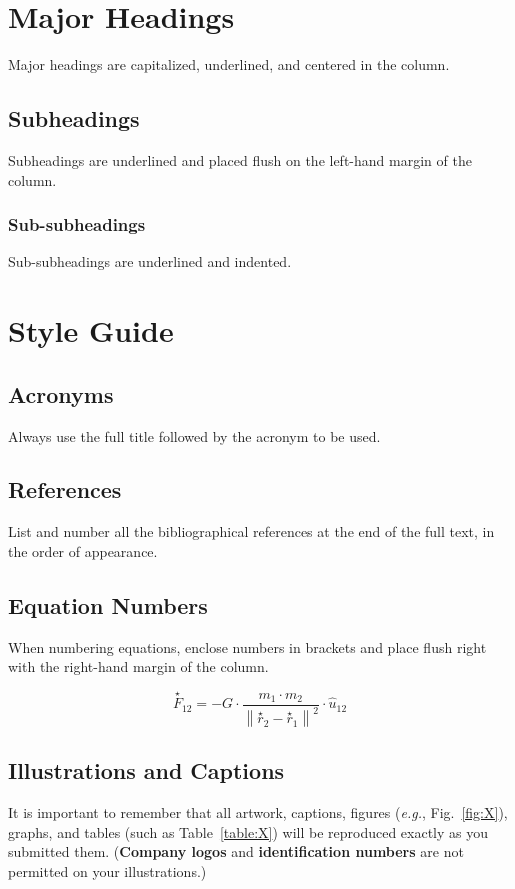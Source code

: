 \documentclass[]{iac}
\begin{document}
\section{Major Headings}
Major headings are capitalized, underlined, and centered in the column.

\subsection{Subheadings}
Subheadings are underlined and placed flush on the left-hand margin of the column.

\subsubsection{Sub-subheadings}
Sub-subheadings are underlined and indented.

\section{Style Guide}

\subsection{Acronyms}
Always use the full title followed by the acronym to be used.

\subsection{References}
List and number all the bibliographical references at the end of the full text, in the order of appearance.~\cite{test_citation}

\subsection{Equation Numbers}
When numbering equations, enclose numbers in brackets and place flush right with the right-hand margin of the column.

\begin{equation}
\stackrel{\star}{F}_{12} = -G \cdot \frac{ m_1 \cdot m_2 }{ \left\|\stackrel{\star}{r}_2 - \stackrel{\star}{r}_1\right\|^2 } \cdot \hat{u}_{12}
\end{equation}

\subsection{Illustrations and Captions}
It is important to remember that all artwork, captions, figures (\textit{e.g.}, Fig.~\ref{fig:X}), graphs, and tables (such as Table~\ref{table:X}) will be reproduced exactly as you submitted them. (\textbf{Company logos} and \textbf{identification numbers} are not permitted on your illustrations.)
\end{document}
